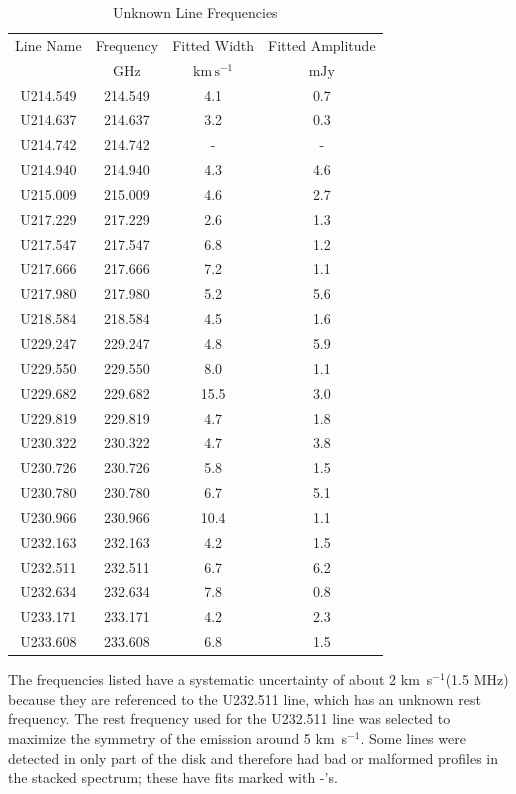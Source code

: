 \documentclass[twocolumn]{aastex61}
\newcommand{\kms}{\textrm{km~s}\ensuremath{^{-1}}\xspace}	%
\begin{document}
\begin{table}[htp]
\centering
\caption{Unknown Line Frequencies}
\begin{tabular}{cccc}
\label{tab:unknown_line_frequencies}
Line Name & Frequency & Fitted Width & Fitted Amplitude \\
 & $\mathrm{GHz}$ & $\mathrm{km\,s^{-1}}$ & $\mathrm{mJy}$ \\
\hline
U214.549 & 214.549 & 4.1 & 0.7 \\
U214.637 & 214.637 & 3.2 & 0.3 \\
U214.742 & 214.742 & - & - \\
U214.940 & 214.940 & 4.3 & 4.6 \\
U215.009 & 215.009 & 4.6 & 2.7 \\
U217.229 & 217.229 & 2.6 & 1.3 \\
U217.547 & 217.547 & 6.8 & 1.2 \\
U217.666 & 217.666 & 7.2 & 1.1 \\
U217.980 & 217.980 & 5.2 & 5.6 \\
U218.584 & 218.584 & 4.5 & 1.6 \\
U229.247 & 229.247 & 4.8 & 5.9 \\
U229.550 & 229.550 & 8.0 & 1.1 \\
U229.682 & 229.682 & 15.5 & 3.0 \\
U229.819 & 229.819 & 4.7 & 1.8 \\
U230.322 & 230.322 & 4.7 & 3.8 \\
U230.726 & 230.726 & 5.8 & 1.5 \\
U230.780 & 230.780 & 6.7 & 5.1 \\
U230.966 & 230.966 & 10.4 & 1.1 \\
U232.163 & 232.163 & 4.2 & 1.5 \\
U232.511 & 232.511 & 6.7 & 6.2 \\
U232.634 & 232.634 & 7.8 & 0.8 \\
U233.171 & 233.171 & 4.2 & 2.3 \\
U233.608 & 233.608 & 6.8 & 1.5 \\
\hline
\end{tabular}

\par The frequencies listed have a systematic uncertainty of about 2 \kms (1.5 MHz) because they are referenced to the U232.511 line, which has an unknown rest frequency.  The rest frequency used for the U232.511 line was selected to maximize the symmetry of the emission around 5 \kms.  Some lines were detected in only part of the disk and therefore had bad or malformed profiles in the stacked spectrum; these have fits marked with -'s.
\end{table}
 
\end{document}
